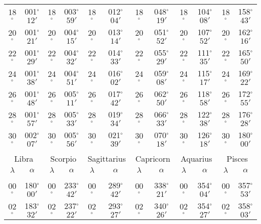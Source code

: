 \begin{table}
{\begin{tabular}{cc|cc|cc|cc|cc|cc}
18$^\circ$ & 001$^\circ$$12'$ & 18$^\circ$ & 003$^\circ$$59'$ & 18$^\circ$ & 012$^\circ$$04'$ & 18$^\circ$ & 048$^\circ$$19'$ & 18$^\circ$ & 104$^\circ$$08'$ & 18$^\circ$ & 158$^\circ$$43'$\\
20$^\circ$ & 001$^\circ$$21'$ & 20$^\circ$ & 004$^\circ$$15'$ & 20$^\circ$ & 013$^\circ$$14'$ & 20$^\circ$ & 051$^\circ$$52'$ & 20$^\circ$ & 107$^\circ$$52'$ & 20$^\circ$ & 162$^\circ$$16'$\\
22$^\circ$ & 001$^\circ$$29'$ & 22$^\circ$ & 004$^\circ$$32'$ & 22$^\circ$ & 014$^\circ$$33'$ & 22$^\circ$ & 055$^\circ$$29'$ & 22$^\circ$ & 111$^\circ$$35'$ & 22$^\circ$ & 165$^\circ$$50'$\\
24$^\circ$ & 001$^\circ$$38'$ & 24$^\circ$ & 004$^\circ$$51'$ & 24$^\circ$ & 016$^\circ$$02'$ & 24$^\circ$ & 059$^\circ$$08'$ & 24$^\circ$ & 115$^\circ$$17'$ & 24$^\circ$ & 169$^\circ$$22'$\\
26$^\circ$ & 001$^\circ$$48'$ & 26$^\circ$ & 005$^\circ$$11'$ & 26$^\circ$ & 017$^\circ$$42'$ & 26$^\circ$ & 062$^\circ$$50'$ & 26$^\circ$ & 118$^\circ$$58'$ & 26$^\circ$ & 172$^\circ$$55'$\\
28$^\circ$ & 001$^\circ$$57'$ & 28$^\circ$ & 005$^\circ$$33'$ & 28$^\circ$ & 019$^\circ$$34'$ & 28$^\circ$ & 066$^\circ$$33'$ & 28$^\circ$ & 122$^\circ$$38'$ & 28$^\circ$ & 176$^\circ$$28'$\\
30$^\circ$ & 002$^\circ$$07'$ & 30$^\circ$ & 005$^\circ$$56'$ & 30$^\circ$ & 021$^\circ$$39'$ & 30$^\circ$ & 070$^\circ$$18'$ & 30$^\circ$ & 126$^\circ$$18'$ & 30$^\circ$ & 180$^\circ$$00'$\\
\multicolumn{12}{c}{}\\
\multicolumn{2}{c}{Libra}\vline & \multicolumn{2}{c}{Scorpio} \vline& \multicolumn{2}{c}{Sagittarius} \vline& \multicolumn{2}{c}{Capricorn}\vline &
\multicolumn{2}{c}{Aquarius}\vline & \multicolumn{2}{c}{Pisces}\\\hline
$\lambda$& $\alpha$& $\lambda$& $\alpha$& $\lambda$& $\alpha$& $\lambda$& $\alpha$& $\lambda$& $\alpha$& $\lambda$& $\alpha$\\\hline
&&&&&&&&&&&\\[-2ex]
00$^\circ$ & 180$^\circ$$00'$ & 00$^\circ$ & 233$^\circ$$42'$ & 00$^\circ$ & 289$^\circ$$42'$ & 00$^\circ$ & 338$^\circ$$21'$ &  00$^\circ$ & 354$^\circ$$04'$ & 00$^\circ$ & 357$^\circ$$53'$\\
02$^\circ$ & 183$^\circ$$32'$ & 02$^\circ$ & 237$^\circ$$22'$ & 02$^\circ$ & 293$^\circ$$27'$ & 02$^\circ$ & 340$^\circ$$26'$ &  02$^\circ$ & 354$^\circ$$27'$ & 02$^\circ$ & 358$^\circ$$03'$\\

\end{tabular}}
\end{table}
